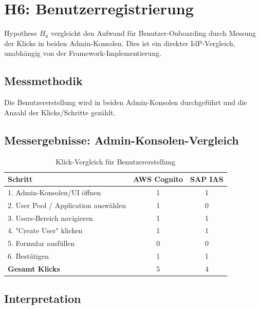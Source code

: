 \section{H6: Benutzerregistrierung}

Hypothese $H_6$ vergleicht den Aufwand für Benutzer-Onboarding durch Messung
der Klicks in beiden Admin-Konsolen. Dies ist ein direkter \ac{IdP}-Vergleich,
unabhängig von der Framework-Implementierung.

\subsection{Messmethodik}

Die Benutzererstellung wird in beiden Admin-Konsolen durchgeführt und die
Anzahl der Klicks/Schritte gezählt.

\subsection{Messergebnisse: Admin-Konsolen-Vergleich}

\begin{table}[h]
    \centering
    \begin{tabular}{|l|c|c|}
        \hline
        \textbf{Schritt}            & \textbf{AWS Cognito}          & \textbf{SAP IAS}          \\
        \hline
        1. Admin-Konsolen/UI öffnen & 1                            & 1                        \\
        \hline
        2. User Pool / Application auswählen            & 1     & 0     \\
        \hline
        3. Users-Bereich navigieren           & 1     & 1     \\
        \hline
        4. "Create User" klicken            & 1     & 1     \\
        \hline
        5. Formular ausfüllen           & 0     & 0     \\
        \hline
        6. Bestätigen           & 1     & 1     \\
        \hline
        \textbf{Gesamt Klicks}            & 5     & 4     \\
        \hline
    \end{tabular}
    \caption{Klick-Vergleich für Benutzererstellung}
    \label{tab:h6_klicks}
\end{table}

\subsection{Interpretation}

